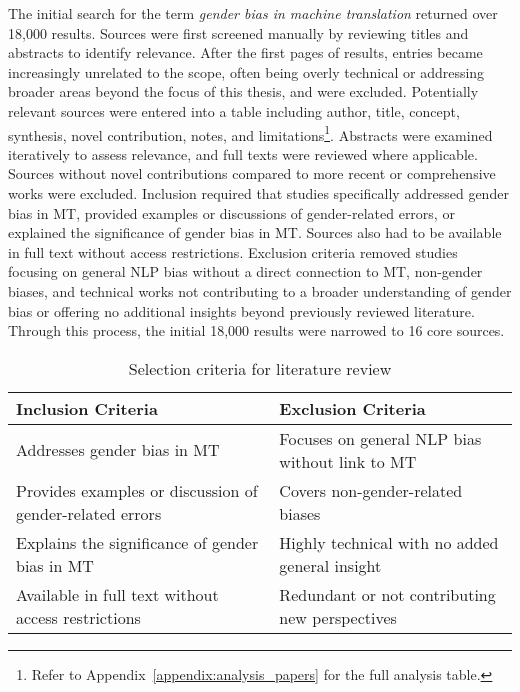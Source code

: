         The initial search for the term \textit{gender bias in machine translation} returned over 18,000 results. Sources were first screened manually by reviewing titles and abstracts to identify relevance. After the first pages of results, entries became increasingly unrelated to the scope, often being overly technical or addressing broader areas beyond the focus of this thesis, and were excluded. Potentially relevant sources were entered into a table including author, title, concept, synthesis, novel contribution, notes, and limitations\footnote{Refer to Appendix~\ref{appendix:analysis_papers} for the full analysis table.}. Abstracts were examined iteratively to assess relevance, and full texts were reviewed where applicable. Sources without novel contributions compared to more recent or comprehensive works were excluded. Inclusion required that studies specifically addressed gender bias in MT, provided examples or discussions of gender-related errors, or explained the significance of gender bias in MT. Sources also had to be available in full text without access restrictions. Exclusion criteria removed studies focusing on general NLP bias without a direct connection to MT, non-gender biases, and technical works not contributing to a broader understanding of gender bias or offering no additional insights beyond previously reviewed literature. Through this process, the initial 18,000 results were narrowed to 16 core sources. 

        \vspace{0.8em}
        \begin{table}[h]
            \centering
            \begin{tabularx}{\textwidth}{X X}
            \toprule
            \textbf{Inclusion Criteria} & \textbf{Exclusion Criteria} \\
            \midrule
            Addresses gender bias in MT & Focuses on general NLP bias without link to MT \\
            Provides examples or discussion of gender-related errors & Covers non-gender-related biases \\
            Explains the significance of gender bias in MT & Highly technical with no added general insight \\
            Available in full text without access restrictions & Redundant or not contributing new perspectives \\
            \bottomrule
            \end{tabularx}
            \caption{Selection criteria for literature review}
        \end{table}

